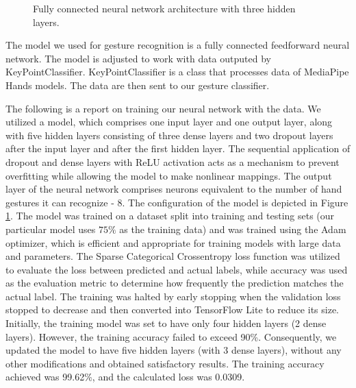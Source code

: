 \begin{figure}[ht]
\begin{tikzpicture}
		
		
	\end{tikzpicture}
	\caption{ Fully connected neural network architecture with three hidden layers.}
	\label{fig:neural_network}
\end{figure}

The model we used for gesture recognition is a fully connected feedforward neural network. The model is adjusted to work with data outputed by KeyPointClassifier. KeyPointClassifier is a class that processes data of MediaPipe Hands models. The data are then sent to our gesture classifier.


The following is a report on training our neural network with the data. We utilized a model, which comprises one input layer and one output layer, along with five hidden layers consisting of three dense layers and two dropout layers after the input layer and after the first hidden layer. The sequential application of dropout and dense layers with ReLU activation acts as a mechanism to prevent overfitting while allowing the model to make nonlinear mappings. The output layer of the neural network comprises neurons equivalent to the number of hand gestures it can recognize - 8. The configuration of the model is depicted in Figure \ref{fig:neural_network}. The model was trained on a dataset split into training and testing sets (our particular model uses $75\%$ as the training data) and was trained using the Adam optimizer, which is efficient and appropriate for training models with large data and parameters. The Sparse Categorical Crossentropy loss function was utilized to evaluate the loss between predicted and actual labels, while accuracy was used as the evaluation metric to determine how frequently the prediction matches the actual label. The training was halted by early stopping when the validation loss stopped to decrease and then converted into TensorFlow Lite to reduce its size. Initially, the training model was set to have only four hidden layers (2 dense layers). However, the training accuracy failed to exceed 90\%. Consequently, we updated the model to have five hidden layers (with 3 dense layers), without any other modifications and obtained satisfactory results. The training accuracy achieved was 99.62\%, and the calculated loss was 0.0309.





